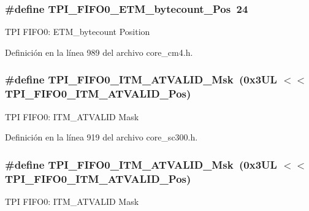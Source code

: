 \subsubsection[{\texorpdfstring{T\+P\+I\+\_\+\+F\+I\+F\+O0\+\_\+\+E\+T\+M\+\_\+bytecount\+\_\+\+Pos}{TPI_FIFO0_ETM_bytecount_Pos}}]{\setlength{\rightskip}{0pt plus 5cm}\#define T\+P\+I\+\_\+\+F\+I\+F\+O0\+\_\+\+E\+T\+M\+\_\+bytecount\+\_\+\+Pos~24}\hypertarget{group___c_m_s_i_s___t_p_i_ga2f738e45386ebf58c4d406f578e7ddaf}{}\label{group___c_m_s_i_s___t_p_i_ga2f738e45386ebf58c4d406f578e7ddaf}
T\+PI F\+I\+F\+O0\+: E\+T\+M\+\_\+bytecount Position 

Definición en la línea 989 del archivo core\+\_\+cm4.\+h.

\subsubsection[{\texorpdfstring{T\+P\+I\+\_\+\+F\+I\+F\+O0\+\_\+\+I\+T\+M\+\_\+\+A\+T\+V\+A\+L\+I\+D\+\_\+\+Msk}{TPI_FIFO0_ITM_ATVALID_Msk}}]{\setlength{\rightskip}{0pt plus 5cm}\#define T\+P\+I\+\_\+\+F\+I\+F\+O0\+\_\+\+I\+T\+M\+\_\+\+A\+T\+V\+A\+L\+I\+D\+\_\+\+Msk~(0x3\+U\+L $<$$<$ T\+P\+I\+\_\+\+F\+I\+F\+O0\+\_\+\+I\+T\+M\+\_\+\+A\+T\+V\+A\+L\+I\+D\+\_\+\+Pos)}\hypertarget{group___c_m_s_i_s___t_p_i_ga94cb2493ed35d2dab7bd4092b88a05bc}{}\label{group___c_m_s_i_s___t_p_i_ga94cb2493ed35d2dab7bd4092b88a05bc}
T\+PI F\+I\+F\+O0\+: I\+T\+M\+\_\+\+A\+T\+V\+A\+L\+ID Mask 

Definición en la línea 919 del archivo core\+\_\+sc300.\+h.

\subsubsection[{\texorpdfstring{T\+P\+I\+\_\+\+F\+I\+F\+O0\+\_\+\+I\+T\+M\+\_\+\+A\+T\+V\+A\+L\+I\+D\+\_\+\+Msk}{TPI_FIFO0_ITM_ATVALID_Msk}}]{\setlength{\rightskip}{0pt plus 5cm}\#define T\+P\+I\+\_\+\+F\+I\+F\+O0\+\_\+\+I\+T\+M\+\_\+\+A\+T\+V\+A\+L\+I\+D\+\_\+\+Msk~(0x3\+U\+L $<$$<$ T\+P\+I\+\_\+\+F\+I\+F\+O0\+\_\+\+I\+T\+M\+\_\+\+A\+T\+V\+A\+L\+I\+D\+\_\+\+Pos)}\hypertarget{group___c_m_s_i_s___t_p_i_ga94cb2493ed35d2dab7bd4092b88a05bc}{}\label{group___c_m_s_i_s___t_p_i_ga94cb2493ed35d2dab7bd4092b88a05bc}
T\+PI F\+I\+F\+O0\+: I\+T\+M\+\_\+\+A\+T\+V\+A\+L\+ID Mask 


